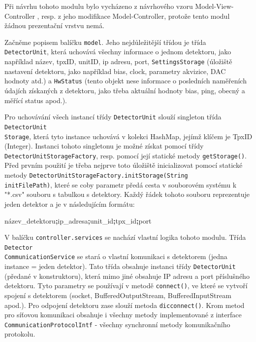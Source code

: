 Při návrhu tohoto modulu bylo vycházeno z návrhového vzoru Model-View-Controller \cite{DesignPatterns-Gamma:1995:DPE:186897}, resp. z jeho modifikace Model-Controller, protože tento modul žádnou prezentační vrstvu nemá. 

Začněme popisem balíčku \texttt{model}. Jeho nejdůležitější třídou je třída \texttt{DetectorUnit}, která uchovává všechny informace o jednom detektoru, jako například název, tpxID, unitID, ip adresu, port, \texttt{SettingsStorage} (úložiště nastavení detektoru, jako například bias, clock, parametry akvizice, DAC hodnoty atd.) a \texttt{HwStatus} (tento objekt nese informace o posledních naměřeních údajích získaných z detektoru, jako třeba aktuální hodnoty bias, ping, obecný a měřící status apod.).

Pro uchovávání všech instancí třídy \texttt{DetectorUnit} slouží singleton \cite{DesignPatterns-Gamma:1995:DPE:186897} třída \texttt{DetectorUnit\\Storage}, která tyto instance uchovává v kolekci HashMap, jejímž klíčem je TpxID (Integer). Instanci tohoto singletonu je možné získat pomocí třídy \texttt{DetectorUnitStorageFactory}, resp. pomocí její statické metody \texttt{getStorage()}. Před prvním použití je třeba nejprve toto úložiště inicializovat pomocí statické metody \texttt{DetectorUnitStorageFactory.initStorage(String\\initFilePath)}, které se coby parametr předá cesta v souborovém systému k "*.csv" souboru s tabulkou s detektory. Každý řádek tohoto souboru reprezentuje jeden detektor a je v následujícím formátu:
\begin{center}
	název\_detektoru\textbf{\Large{;}}ip\_adresa\textbf{\Large{;}}unit\_id\textbf{\Large{;}}tpx\_id\textbf{\Large{;}}port
\end{center}

V balíčku \texttt{controller.services} se nachází vlastní logika tohoto modulu. 
Třída \texttt{Detector\\CommunicationService} se stará o vlastní komunikaci s detektorem (jedna instance = jeden detektor). Tato třída obsahuje instanci třídy \texttt{DetectorUnit} (předané v konstruktoru), která mimo jiné obsahuje IP adresu a port příslušného detektoru. Tyto parametry se používají v metodě \texttt{connect()}, ve které se vytvoří spojení s detektorem (socket, BufferedOutputStream, BufferedInputStream apod.). Pro odpojení detektoru zase slouží metoda \texttt{dicconnect()}. Krom metod pro síťovou komunikaci obsahuje i všechny metody implementované z interface \texttt{CommunicationProtocolIntf} - všechny synchronní metody komunikačního protokolu. 

